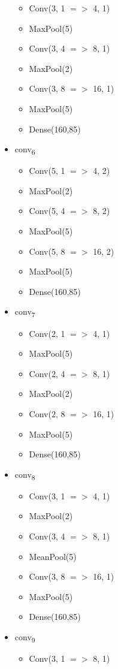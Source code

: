 \documentclass[12pt]{article}
\begin{document}
\begin{itemize}
\begin{itemize}
		\item Conv(3, 1 $=>$ 4, 1)
  		\item MaxPool(5)
		\item Conv(3, 4 $=>$ 8, 1)
    	\item MaxPool(2)
		\item Conv(3, 8 $=>$ 16, 1)
		\item MaxPool(5)
  		\item Dense(160,85)
	\end{itemize}
	\item conv\textsubscript{6} \begin{itemize}
		\item Conv(5, 1 $=>$ 4, 2)
  		\item MaxPool(2)
		\item Conv(5, 4 $=>$ 8, 2)
    	\item MaxPool(5)
		\item Conv(5, 8 $=>$ 16, 2)
		\item MaxPool(5)
  		\item Dense(160,85)
	\end{itemize}
	\item conv\textsubscript{7} \begin{itemize}
		\item Conv(2, 1 $=>$ 4, 1)
  		\item MaxPool(5)
		\item Conv(2, 4 $=>$ 8, 1)
    	\item MaxPool(2)
		\item Conv(2, 8 $=>$ 16, 1)
		\item MaxPool(5)
  		\item Dense(160,85)
	\end{itemize}
	\item conv\textsubscript{8} \begin{itemize}
		\item Conv(3, 1 $=>$ 4, 1)
  		\item MaxPool(2)
		\item Conv(3, 4 $=>$ 8, 1)
    	\item MeanPool(5)
		\item Conv(3, 8 $=>$ 16, 1)
		\item MaxPool(5)
  		\item Dense(160,85)
	\end{itemize}
	\item conv\textsubscript{9} \begin{itemize}
		\item Conv(3, 1 $=>$ 8, 1)

\end{itemize}
\end{itemize}
\end{document}
